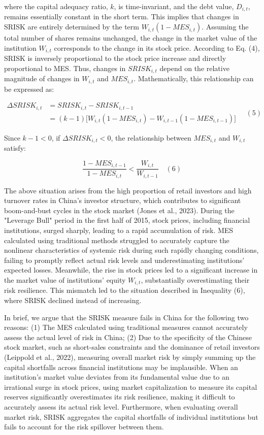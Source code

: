 \documentclass[12pt,a4paper]{article}
\begin{document}
    where the capital adequacy ratio, $k$, is time-invariant, and the debt value, $D_{i,t}$, remains essentially constant in the short term. This implies that changes in SRISK are entirely determined by the term $W_{i,t}(1 - MES_{i,t})$. Assuming the total number of shares remains unchanged, the change in the market value of the institution $W_{i,t}$ corresponds to the change in its stock price. According to Eq. (4), SRISK is inversely proportional to the stock price increase and directly proportional to MES. Thus, changes in $SRISK_{i,t}$ depend on the relative magnitude of changes in $W_{i,t}$ and $MES_{i,t}$. Mathematically, this relationship can be expressed as:

    \[
    \begin{aligned}
    \Delta SRISK_{i,t} &= SRISK_{i,t} - SRISK_{i,t-1} \\
    &= (k-1)\big[W_{i,t}(1-MES_{i,t}) - W_{i,t-1}(1-MES_{i,t-1})\big]
    \end{aligned} \quad (5)
    \]

    Since $k-1<0$, if $\Delta SRISK_{i,t}<0$, the relationship between $MES_{i,t}$ and $W_{i,t}$ satisfy:

    \[
    \frac{1 - MES_{i,t-1}}{1 - MES_{i,t}} < \frac{W_{i,t}}{W_{i,t-1}} \quad (6)
    \]

    The above situation arises from the high proportion of retail investors and high turnover rates in China's investor structure, which contributes to significant boom-and-bust cycles in the stock market (Jones et al., 2023). During the "Leverage Bull" period in the first half of 2015, stock prices, including financial institutions, surged sharply, leading to a rapid accumulation of risk. MES calculated using traditional methods struggled to accurately capture the nonlinear characteristics of systemic risk during such rapidly changing conditions, failing to promptly reflect actual risk levels and underestimating institutions' expected losses. Meanwhile, the rise in stock prices led to a significant increase in the market value of institutions' equity $W_{i,t}$, substantially overestimating their risk resilience. This mismatch led to the situation described in Inequality (6), where SRISK declined instead of increasing.

    In brief, we argue that the SRISK measure fails in China for the following two reasons: (1) The MES calculated using traditional measures cannot accurately assess the actual level of risk in China; (2) Due to the specificity of the Chinese stock market, such as short-sales constraints and the dominance of retail investors (Leippold et al., 2022), measuring overall market risk by simply summing up the capital shortfalls across financial institutions may be implausible. When an institution's market value deviates from its fundamental value due to an irrational surge in stock prices, using market capitalization to measure its capital reserves significantly overestimates its risk resilience, making it difficult to accurately assess its actual risk level. Furthermore, when evaluating overall market risk, SRISK aggregates the capital shortfalls of individual institutions but fails to account for the risk spillover between them.
\end{document}
